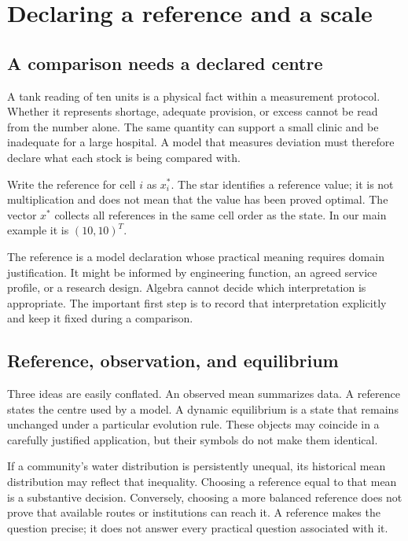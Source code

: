 \chapter{Declaring a reference and a scale}\label{ch:reference}

\section{A comparison needs a declared centre}
A tank reading of ten units is a physical fact within a measurement protocol. Whether it represents shortage, adequate provision, or excess cannot be read from the number alone. The same quantity can support a small clinic and be inadequate for a large hospital. A model that measures deviation must therefore declare what each stock is being compared with.

Write the reference for cell \(i\) as \(x_i^*\). The star identifies a reference value; it is not multiplication and does not mean that the value has been proved optimal. The vector \(x^*\) collects all references in the same cell order as the state. In our main example it is \((10,10)^T\).

The reference is a model declaration whose practical meaning requires domain justification. It might be informed by engineering function, an agreed service profile, or a research design. Algebra cannot decide which interpretation is appropriate. The important first step is to record that interpretation explicitly and keep it fixed during a comparison.

\section{Reference, observation, and equilibrium}
Three ideas are easily conflated. An observed mean summarizes data. A reference states the centre used by a model. A dynamic equilibrium is a state that remains unchanged under a particular evolution rule. These objects may coincide in a carefully justified application, but their symbols do not make them identical.

If a community's water distribution is persistently unequal, its historical mean distribution may reflect that inequality. Choosing a reference equal to that mean is a substantive decision. Conversely, choosing a more balanced reference does not prove that available routes or institutions can reach it. A reference makes the question precise; it does not answer every practical question associated with it.

